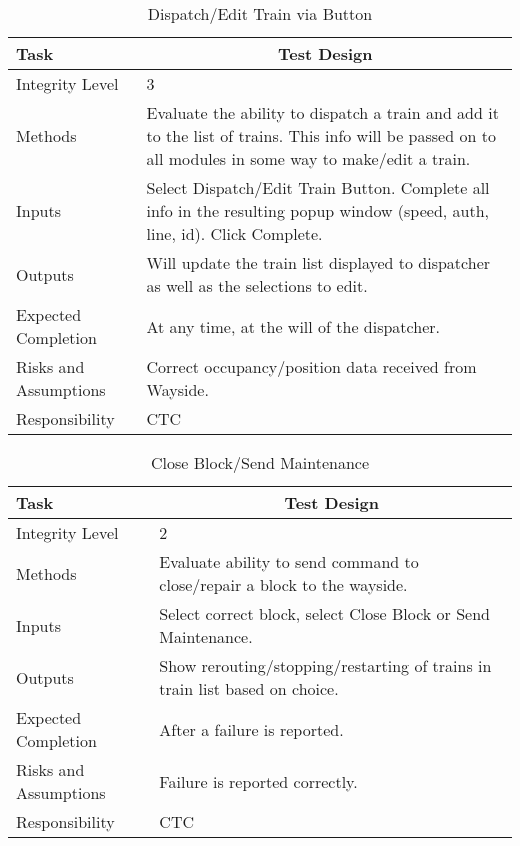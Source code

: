 \documentclass[]{article}
\begin{document}
 
\begin{table}[H]
	\centering
	\caption{Dispatch/Edit Train via Button}
	\begin{tabular}{|l|l|}
		\hline
		Task & \multicolumn{1}{c|}{Test Design} \\ \hline
		Integrity Level & 3 \\ \hline
		Methods & \parbox[t]{10cm}{Evaluate the ability to dispatch a train and add it to the list of trains. This info will be passed on to all modules in some way to make/edit a train.}\\ \hline
		Inputs &  \parbox[t]{10cm}{Select Dispatch/Edit Train Button. Complete all info in the resulting popup window (speed, auth, line, id). Click Complete.} \\ \hline
		Outputs &  \parbox[t]{10cm}{Will update the train list displayed to dispatcher as well as the selections to edit.} \\ \hline
		Expected Completion & At any time, at the will of the dispatcher. \\ \hline
		Risks and Assumptions & \parbox[t]{10cm}{Correct occupancy/position data received from Wayside.}  \\ \hline
		Responsibility & CTC\\ \hline
	\end{tabular}
\end{table}

\begin{table}[H]
	\centering
	\caption{Close Block/Send Maintenance}
	\begin{tabular}{|l|l|}
		\hline
		Task & \multicolumn{1}{c|}{Test Design} \\ \hline
		Integrity Level & 2 \\ \hline
		Methods & \parbox[t]{10cm}{Evaluate ability to send command to close/repair a block to the wayside.}\\ \hline
		Inputs &  Select correct block, select Close Block or Send Maintenance. \\ \hline
		Outputs &  \parbox[t]{10cm}{Show rerouting/stopping/restarting of trains in train list based on choice.}\\ \hline
		Expected Completion & After a failure is reported.\\ \hline
		Risks and Assumptions & \parbox[t]{10cm}{Failure is reported correctly.} \\ \hline
		Responsibility & CTC\\ \hline
	\end{tabular}
\end{table}
\end{document}
